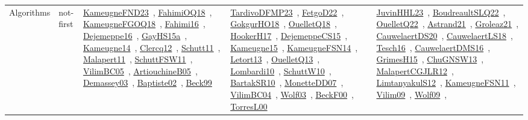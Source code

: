 {\begin{longtable}{lp{3cm}>{\raggedright\arraybackslash}p{6cm}>{\raggedright\arraybackslash}p{6cm}>{\raggedright\arraybackslash}p{8cm}}
Algorithms & not-first & \href{../works/KameugneFND23.pdf}{KameugneFND23}~\cite{KameugneFND23}, \href{../works/FahimiOQ18.pdf}{FahimiOQ18}~\cite{FahimiOQ18}, \href{../works/KameugneFGOQ18.pdf}{KameugneFGOQ18}~\cite{KameugneFGOQ18}, \href{../works/Fahimi16.pdf}{Fahimi16}~\cite{Fahimi16}, \href{../works/Dejemeppe16.pdf}{Dejemeppe16}~\cite{Dejemeppe16}, \href{../works/GayHS15a.pdf}{GayHS15a}~\cite{GayHS15a}, \href{../works/Kameugne14.pdf}{Kameugne14}~\cite{Kameugne14}, \href{../works/Clercq12.pdf}{Clercq12}~\cite{Clercq12}, \href{../works/Schutt11.pdf}{Schutt11}~\cite{Schutt11}, \href{../works/Malapert11.pdf}{Malapert11}~\cite{Malapert11}, \href{../works/SchuttFSW11.pdf}{SchuttFSW11}~\cite{SchuttFSW11}, \href{../works/VilimBC05.pdf}{VilimBC05}~\cite{VilimBC05}, \href{../works/ArtiouchineB05.pdf}{ArtiouchineB05}~\cite{ArtiouchineB05}, \href{../works/Demassey03.pdf}{Demassey03}~\cite{Demassey03}, \href{../works/Baptiste02.pdf}{Baptiste02}~\cite{Baptiste02}, \href{../works/Beck99.pdf}{Beck99}~\cite{Beck99} & \href{../works/TardivoDFMP23.pdf}{TardivoDFMP23}~\cite{TardivoDFMP23}, \href{../works/FetgoD22.pdf}{FetgoD22}~\cite{FetgoD22}, \href{../works/GokgurHO18.pdf}{GokgurHO18}~\cite{GokgurHO18}, \href{../works/OuelletQ18.pdf}{OuelletQ18}~\cite{OuelletQ18}, \href{../works/HookerH17.pdf}{HookerH17}~\cite{HookerH17}, \href{../works/DejemeppeCS15.pdf}{DejemeppeCS15}~\cite{DejemeppeCS15}, \href{../works/Kameugne15.pdf}{Kameugne15}~\cite{Kameugne15}, \href{../works/KameugneFSN14.pdf}{KameugneFSN14}~\cite{KameugneFSN14}, \href{../works/Letort13.pdf}{Letort13}~\cite{Letort13}, \href{../works/OuelletQ13.pdf}{OuelletQ13}~\cite{OuelletQ13}, \href{../works/Lombardi10.pdf}{Lombardi10}~\cite{Lombardi10}, \href{../works/SchuttW10.pdf}{SchuttW10}~\cite{SchuttW10}, \href{../works/BartakSR10.pdf}{BartakSR10}~\cite{BartakSR10}, \href{../works/MonetteDD07.pdf}{MonetteDD07}~\cite{MonetteDD07}, \href{../works/VilimBC04.pdf}{VilimBC04}~\cite{VilimBC04}, \href{../works/Wolf03.pdf}{Wolf03}~\cite{Wolf03}, \href{../works/BeckF00.pdf}{BeckF00}~\cite{BeckF00}, \href{../works/TorresL00.pdf}{TorresL00}~\cite{TorresL00} & \href{../works/JuvinHHL23.pdf}{JuvinHHL23}~\cite{JuvinHHL23}, \href{../works/BoudreaultSLQ22.pdf}{BoudreaultSLQ22}~\cite{BoudreaultSLQ22}, \href{../works/OuelletQ22.pdf}{OuelletQ22}~\cite{OuelletQ22}, \href{../works/Astrand21.pdf}{Astrand21}~\cite{Astrand21}, \href{../works/Groleaz21.pdf}{Groleaz21}~\cite{Groleaz21}, \href{../works/CauwelaertDS20.pdf}{CauwelaertDS20}~\cite{CauwelaertDS20}, \href{../works/CauwelaertLS18.pdf}{CauwelaertLS18}~\cite{CauwelaertLS18}, \href{../works/Tesch16.pdf}{Tesch16}~\cite{Tesch16}, \href{../works/CauwelaertDMS16.pdf}{CauwelaertDMS16}~\cite{CauwelaertDMS16}, \href{../works/GrimesH15.pdf}{GrimesH15}~\cite{GrimesH15}, \href{../works/ChuGNSW13.pdf}{ChuGNSW13}~\cite{ChuGNSW13}, \href{../works/MalapertCGJLR12.pdf}{MalapertCGJLR12}~\cite{MalapertCGJLR12}, \href{../works/LimtanyakulS12.pdf}{LimtanyakulS12}~\cite{LimtanyakulS12}, \href{../works/KameugneFSN11.pdf}{KameugneFSN11}~\cite{KameugneFSN11}, \href{../works/Vilim09.pdf}{Vilim09}~\cite{Vilim09}, \href{../works/Wolf09.pdf}{Wolf09}~\cite{Wolf09}, 
\end{longtable}}
